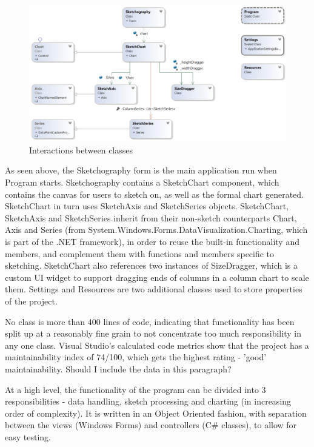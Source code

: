 	\begin{figure}[h]
		\includegraphics[width=1\linewidth]{ClassDiagram}
		\caption{Interactions between classes}
	\end{figure}		
	
	As seen above, the Sketchography form is the main application run when Program starts. Sketchography contains a SketchChart component, which contains the canvas for users to sketch on, as well as the formal chart generated. SketchChart in turn uses SketchAxis and SketchSeries objects. SketchChart, SketchAxis and SketchSeries inherit from their non-sketch counterparts Chart, Axis and Series (from System.Windows.Forms.DataVisualization.Charting, which is part of the .NET framework), in order to reuse the built-in functionality and members, and complement them with functions and members specific to sketching. SketchChart also references two instances of SizeDragger, which is a custom UI widget to support dragging ends of columns in a column chart to scale them. Settings and Resources are two additional classes used to store properties of the project.
	
	
	No class is more than 400 lines of code, indicating that functionality has been split up at a reasonably fine grain to not concentrate too much responsibility in any one class. Visual Studio's calculated code metrics show that the project has a maintainability index of 74/100, which gets the highest rating - 'good' maintainability. Should I include the data in this paragraph?
	
	At a high level, the functionality of the program can be divided into 3 responsibilities - data handling, sketch processing and charting (in increasing order of complexity). It is written in an Object Oriented fashion, with separation between the views (Windows Forms) and controllers (C\# classes), to allow for easy testing.
	
